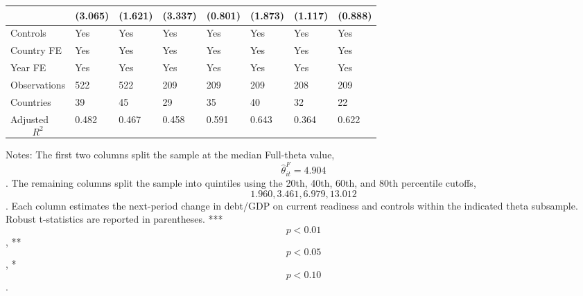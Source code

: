 \begin{table}[H]
\begin{threeparttable}
\begin{tabularx}{\textwidth}{lYYYYYYY}
  & (3.065) & (1.621) & (3.337) & (0.801) & (1.873) & (1.117) & (0.888) \\
\midrule
Controls & Yes & Yes & Yes & Yes & Yes & Yes & Yes \\
Country FE & Yes & Yes & Yes & Yes & Yes & Yes & Yes \\
Year FE & Yes & Yes & Yes & Yes & Yes & Yes & Yes \\
Observations & 522 & 522 & 209 & 209 & 209 & 208 & 209 \\
Countries & 39 & 45 & 29 & 35 & 40 & 32 & 22 \\
Adjusted $$R^2$$ & 0.482 & 0.467 & 0.458 & 0.591 & 0.643 & 0.364 & 0.622 \\
\bottomrule
\end{tabularx}
\begin{tablenotes}[flushleft]\footnotesize
\item Notes: The first two columns split the sample at the median Full-theta value, $$\widehat{\theta}^{F}_{it}=4.904$$. The remaining columns split the sample into quintiles using the 20th, 40th, 60th, and 80th percentile cutoffs, $$1.960, 3.461, 6.979, 13.012$$. Each column estimates the next-period change in debt/GDP on current readiness and controls within the indicated theta subsample. Robust t-statistics are reported in parentheses. *** $$p<0.01$$, ** $$p<0.05$$, * $$p<0.10$$.
\end{tablenotes}
\end{threeparttable}
\end{table}

